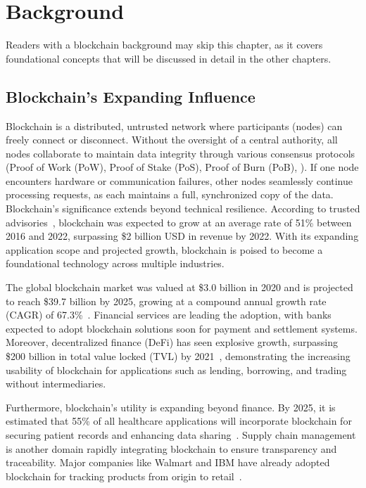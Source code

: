 
\chapter{Background}\label{ch:background}
Readers with a blockchain background may skip this chapter, as it covers foundational concepts that will be discussed in detail in the other chapters.

\section{Blockchain's Expanding Influence}
Blockchain is a distributed, untrusted network where participants (nodes) can freely connect or disconnect. Without the oversight of a central authority, all nodes collaborate to maintain data integrity through various consensus protocols (\eg Proof of Work (PoW), Proof of Stake (PoS), Proof of Burn (PoB), \etc). If one node encounters hardware or communication failures, other nodes seamlessly continue processing requests, as each maintains a full, synchronized copy of the data. Blockchain's significance extends beyond technical resilience. According to trusted advisories~\cite{Gartner, Reportlinker}, blockchain was expected to grow at an average rate of 51\% between 2016 and 2022, surpassing \$2 billion USD in revenue by 2022. With its expanding application scope and projected growth, blockchain is poised to become a foundational technology across multiple industries.

The global blockchain market was valued at \$3.0 billion in 2020 and is projected to reach \$39.7 billion by 2025, growing at a compound annual growth rate (CAGR) of 67.3\%~\cite{GrandViewResearch2020}. Financial services are leading the adoption, with banks expected to adopt blockchain solutions soon for payment and settlement systems. Moreover, decentralized finance (DeFi) has seen explosive growth, surpassing \$200 billion in total value locked (TVL) by 2021~\cite{MarketsandMarkets2020}, demonstrating the increasing usability of blockchain for applications such as lending, borrowing, and trading without intermediaries.

Furthermore, blockchain’s utility is expanding beyond finance. By 2025, it is estimated that 55\% of all healthcare applications will incorporate blockchain for securing patient records and enhancing data sharing~\cite{XcubeLabs2020}. Supply chain management is another domain rapidly integrating blockchain to ensure transparency and traceability. Major companies like Walmart and IBM have already adopted blockchain for tracking products from origin to retail~\cite{Sristy2021}.

